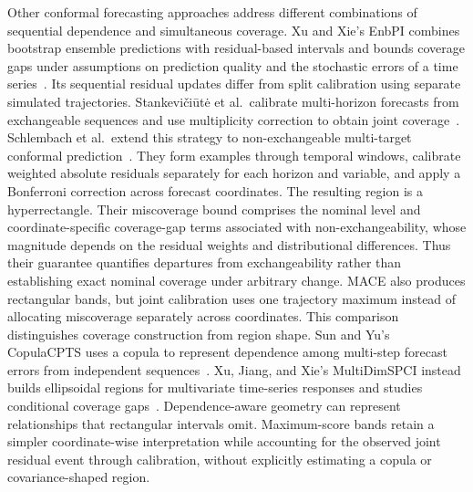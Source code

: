 Other conformal forecasting approaches address different combinations of sequential dependence and simultaneous coverage. Xu and Xie's EnbPI combines bootstrap ensemble predictions with residual-based intervals and bounds coverage gaps under assumptions on prediction quality and the stochastic errors of a time series~\cite{xu2021enbpi}. Its sequential residual updates differ from split calibration using separate simulated trajectories. Stankevi\v{c}i\={u}t\.{e} et al.\ calibrate multi-horizon forecasts from exchangeable sequences and use multiplicity correction to obtain joint coverage~\cite{stankeviciute2021forecasting}. Schlembach et al.\ extend this strategy to non-exchangeable multi-target conformal prediction~\cite{schlembach2025multivariate}. They form examples through temporal windows, calibrate weighted absolute residuals separately for each horizon and variable, and apply a Bonferroni correction across forecast coordinates. The resulting region is a hyperrectangle. Their miscoverage bound comprises the nominal level and coordinate-specific coverage-gap terms associated with non-exchangeability, whose magnitude depends on the residual weights and distributional differences. Thus their guarantee quantifies departures from exchangeability rather than establishing exact nominal coverage under arbitrary change. MACE also produces rectangular bands, but joint calibration uses one trajectory maximum instead of allocating miscoverage separately across coordinates. This comparison distinguishes coverage construction from region shape. Sun and Yu's CopulaCPTS uses a copula to represent dependence among multi-step forecast errors from independent sequences~\cite{sun2024copulacpts}. Xu, Jiang, and Xie's MultiDimSPCI instead builds ellipsoidal regions for multivariate time-series responses and studies conditional coverage gaps~\cite{xu2024ellipsoidal}. Dependence-aware geometry can represent relationships that rectangular intervals omit. Maximum-score bands retain a simpler coordinate-wise interpretation while accounting for the observed joint residual event through calibration, without explicitly estimating a copula or covariance-shaped region.


